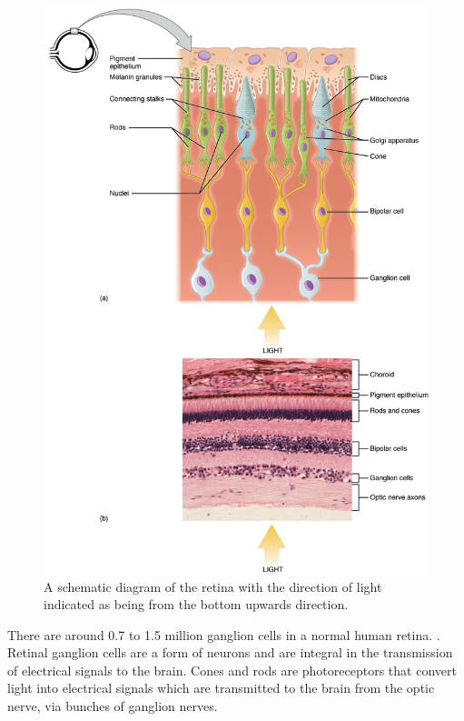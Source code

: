 \begin{figure}[!htbp]
 \centering
   \includegraphics{figures/rods_and_cones}
 \caption{A schematic diagram of the retina with the direction of light indicated
 as being from the bottom upwards direction.}
 \label{fig:retina}
\end{figure}

There are around 0.7 to 1.5 million ganglion cells in a normal human retina.
\cite{curcio1990topography}. Retinal ganglion cells are a form of neurons and
are integral in the transmission of electrical signals to the brain.
\cite{meyer1995characterization} Cones and rods are photoreceptors that
convert light into electrical signals which are transmitted to the
brain from the optic nerve, via bunches of ganglion nerves.

